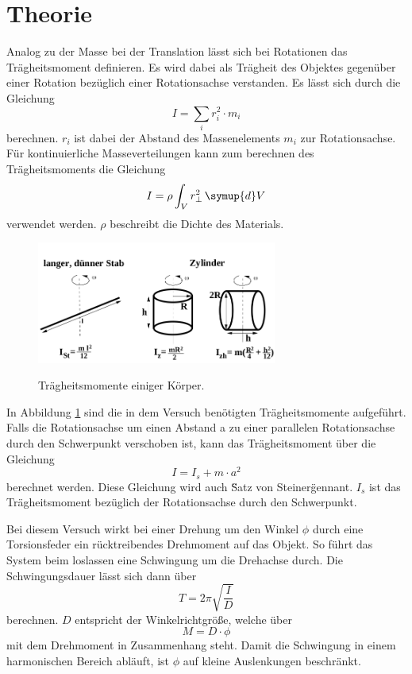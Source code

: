 \section{Theorie}
\label{sec:Theorie}
Analog zu der Masse bei der Translation lässt sich bei Rotationen das Trägheitsmoment definieren. Es wird dabei als Trägheit des Objektes gegenüber einer Rotation bezüglich einer Rotationsachse verstanden. Es lässt sich durch die Gleichung 
\begin{equation}
    I=\sum_{i}r_i^2\cdot m_i
\end{equation}
berechnen. $r_i$ ist dabei der Abstand des Massenelements $m_i$ zur Rotationsachse.
Für kontinuierliche Masseverteilungen kann zum berechnen des Trägheitsmoments die Gleichung
\begin{equation}
    I=\rho\int_V r_\perp^2 \,\symup{d}V
\end{equation}
verwendet werden. $\rho$ beschreibt die Dichte des Materials.


\begin{figure}
    \caption{Trägheitsmomente einiger Körper.}
    \centering
    \includegraphics[height=4cm]{data/Probekoerper.png}
    \label{fig:probe}
\end{figure}


In Abbildung \ref{fig:probe} sind die in dem Versuch benötigten Trägheitsmomente aufgeführt. 
Falls die Rotationsachse um einen Abstand a zu einer parallelen Rotationsachse durch den Schwerpunkt verschoben ist, kann das Trägheitsmoment über die Gleichung
\begin{equation}
\label{eqn:stein}
    I=I_s+m\cdot a^2
\end{equation}
berechnet werden. Diese Gleichung wird auch \"Satz von Steiner\" gennant.  $I_s$ ist das Trägheitsmoment bezüglich der Rotationsachse durch den Schwerpunkt.


Bei diesem Versuch wirkt bei einer Drehung um den Winkel $\phi$ durch eine Torsionsfeder ein rücktreibendes Drehmoment auf das Objekt. So führt das System beim loslassen eine Schwingung um die Drehachse durch. Die Schwingungsdauer lässt sich dann über 
\begin{equation}
\label{eqn:T}
    T=2\pi \sqrt{\frac{I}{D}}
\end{equation}
berechnen. $D$ entspricht der Winkelrichtgröße, welche über  
\begin{equation}
\label{eqn:M}
    M=D\cdot \phi
\end{equation}
mit dem Drehmoment in Zusammenhang steht.
Damit die Schwingung in einem harmonischen Bereich abläuft, ist $\phi$ auf kleine Auslenkungen beschränkt.


